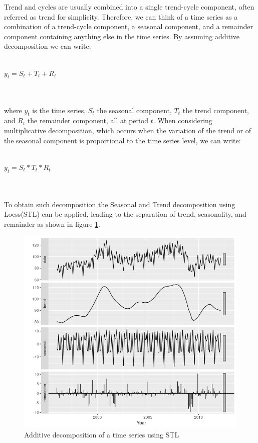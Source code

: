 \documentclass[a4paper]{article} %
\begin{document}
	Trend and cycles are usually combined into a single trend-cycle component, often referred as trend for simplicity.
	Therefore, we can think of a time series as a combination of a trend-cycle component, a seasonal component, and a remainder component containing anything else in the time series.
	By assuming additive decomposition we can write:\\\\
	\centerline{$y_t = S_t + T_t + R_t$}\\\\
	where $y_t$ is the time series, $S_t$ the seasonal component, $T_t$ the trend component, and $R_t$ the remainder component, all at period $t$. When considering multiplicative decomposition, which occurs when the variation of the trend or of the seasonal component is proportional to the time series level, we can write: \\\\
	\centerline{$y_t = S_t * T_t * R_t$}\\\\
	To obtain such decomposition the Seasonal and Trend decomposition using Loess(STL) \cite{STL} can be applied, leading to the separation of trend, seasonality, and remainder as shown in figure \ref{fig:stl}.
	\begin{figure}
		\includegraphics[width=\linewidth]{img/sota_ts_additive_decomposition.png}
		\caption{Additive decomposition of a time series using STL}
		\label{fig:stl}
	\end{figure}
	
\end{document}
